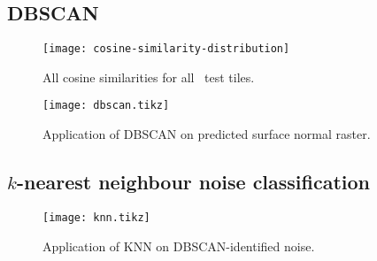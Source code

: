 \subsection{DBSCAN}

\begin{figure}[H]
  \centering
  \texttt{[image: cosine-similarity-distribution]}
  \caption{All cosine similarities for all \numtesttiles~test tiles.}
\end{figure}

\begin{figure}[H]
  \centering
  \texttt{[image: dbscan.tikz]}
  \caption{Application of DBSCAN on predicted surface normal raster.}
\end{figure}

\subsection{\texorpdfstring{$k$}{k}-nearest neighbour noise classification}

\begin{figure}[H]
  \centering
  \texttt{[image: knn.tikz]}
  \caption{Application of KNN on DBSCAN-identified noise.}
\end{figure}
